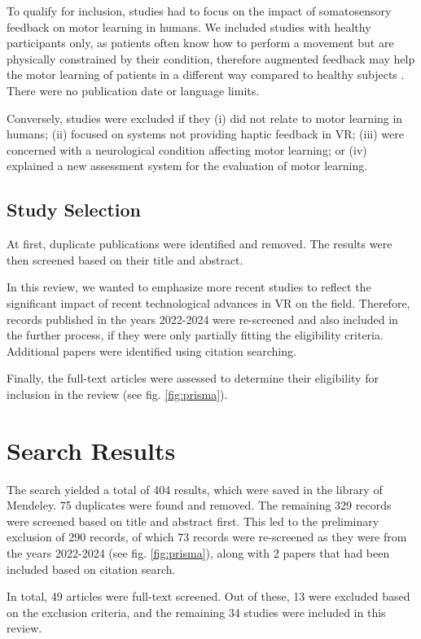 To qualify for inclusion, studies had to focus on the impact of somatosensory feedback on motor learning in humans. We included studies with healthy participants only, as patients often know how to perform a movement but are physically constrained by their condition, therefore augmented feedback may help the motor learning of patients in a different way compared to healthy subjects \cite{Sigrist2013AugmentedReview}. There were no publication date or language limits.

Conversely, studies were excluded if they (i) did not relate to motor learning in humans; (ii) focused on systems not providing haptic feedback in VR; (iii) were concerned with a neurological condition affecting motor learning; or (iv) explained a new assessment system for the evaluation of motor learning.

\subsection{Study Selection}
At first, duplicate publications were identified and removed. The results were then screened based on their title and abstract. 

In this review, we wanted to emphasize more recent studies to reflect the significant impact of recent technological advances in VR on the field. Therefore, records published in the years 2022-2024 were re-screened and also included in the further process, if they were only partially fitting the eligibility criteria. Additional papers were identified using citation searching.

Finally, the full-text articles were assessed to determine their eligibility for inclusion in the review (see fig. \ref{fig:prisma}).


\section{Search Results}


The search yielded a total of 404 results, which were saved in the library of Mendeley. 75 duplicates were found and removed. The remaining 329 records were screened based on title and abstract first. This led to the preliminary exclusion of 290 records, of which 73 records were re-screened as they were from the years 2022-2024 (see fig. \ref{fig:prisma}), along with 2 papers that had been included based on citation search. 

In total, 49 articles were full-text screened. Out of these, 13 were excluded based on the exclusion criteria, and the remaining 34 studies were included in this review.


